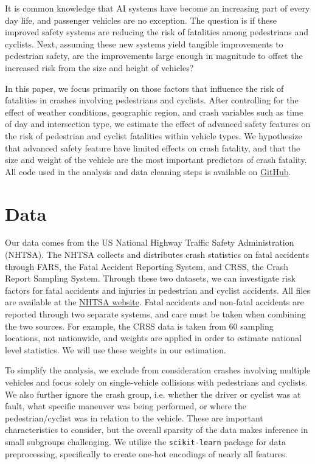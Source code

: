 \documentclass[12pt]{article}
\begin{document}
It is common knowledge that AI systems have become an increasing part of every day life, and passenger
vehicles are no exception. The question is if these improved safety systems are reducing the risk of fatalities
among pedestrians and cyclists. Next, assuming these new systems yield tangible improvements to pedestrian safety,
are the improvements large enough in magnitude to offset the increased risk from the size and height of vehicles?

In this paper, we focus primarily on those factors that influence the risk of fatalities in crashes involving pedestrians
and cyclists. After controlling for the effect of weather conditions,
geographic region, and crash variables such as time of day and intersection type, we estimate the effect
of advanced safety features on the risk of pedestrian and cyclist fatalities within vehicle types. We hypothesize
that advanced safety feature have limited effects on crash fatality, and that the size and weight of the vehicle are 
the most important predictors of crash fatality. All code used in the analysis and data cleaning steps is available on
\href{https://github.com/mcanearm/road_fatilities}{GitHub}.


\section{Data}

Our data comes from the US National Highway Traffic Safety Administration (NHTSA). The NHTSA collects and distributes
crash statistics on fatal accidents through FARS, the Fatal Accident Reporting System, and CRSS, the Crash Report
Sampling System. Through these two datasets, we can investigate risk factors for fatal accidents and injuries in
pedestrian and cyclist accidents. All files are available at the
    \href{https://www.nhtsa.gov/file-downloads?p=nhtsa/downloads/}{NHTSA website}.  Fatal accidents and non-fatal 
accidents are reported through two separate systems, and care must be taken when combining the two sources. For example,
the CRSS data is taken from 60 sampling locations, not nationwide, and weights are applied in order to estimate 
national level statistics\cite{national_highway_traffic_safety_administration_crash_nodate}. We will use these weights
in our estimation. 

To simplify the analysis, we exclude from consideration crashes involving multiple vehicles and focus solely 
on single-vehicle collisions with pedestrians and cyclists. We also further ignore the crash group, i.e. 
whether the driver or cyclist was at fault, what specific maneuver was being performed, or where the pedestrian/cyclist
was in relation to the vehicle. These are important characteristics to consider, but the overall sparsity of the data 
makes inference in small subgroups challenging. We utilize the \texttt{scikit-learn} package for data preprocessing,
specifically to create one-hot encodings of nearly all features\cite{pedregosa_scikit-learn_2011}.
\end{document}
